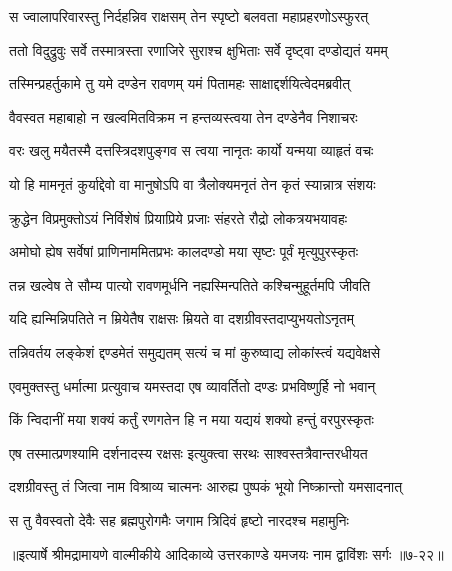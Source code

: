 \twolineshloka
{स ज्वालापरिवारस्तु निर्दहन्निव राक्षसम्}
{तेन स्पृष्टो बलवता महाप्रहरणोऽस्फुरत्} %

\twolineshloka
{ततो विदुद्रुवुः सर्वे तस्मात्रस्ता रणाजिरे}
{सुराश्च क्षुभिताः सर्वे दृष्ट्वा दण्डोद्यतं यमम्} %

\twolineshloka
{तस्मिन्प्रहर्तुकामे तु यमे दण्डेन रावणम्}
{यमं पितामहः साक्षाद्दर्शयित्वेदमब्रवीत्} %

\twolineshloka
{वैवस्वत महाबाहो न खल्वमितविक्रम}
{न हन्तव्यस्त्वया तेन दण्डेनैव निशाचरः} %

\twolineshloka
{वरः खलु मयैतस्मै दत्तस्त्रिदशपुङ्गव}
{स त्वया नानृतः कार्यो यन्मया व्याहृतं वचः} %

\twolineshloka
{यो हि मामनृतं कुर्याद्देवो वा मानुषोऽपि वा}
{त्रैलोक्यमनृतं तेन कृतं स्यान्नात्र संशयः} %

\twolineshloka
{क्रुद्धेन विप्रमुक्तोऽयं निर्विशेषं प्रियाप्रिये}
{प्रजाः संहरते रौद्रो लोकत्रयभयावहः} %

\twolineshloka
{अमोघो ह्येष सर्वेषां प्राणिनाममितप्रभः}
{कालदण्डो मया सृष्टः पूर्वं मृत्युपुरस्कृतः} %

\twolineshloka
{तन्न खल्वेष ते सौम्य पात्यो रावणमूर्धनि}
{नह्यस्मिन्पतिते कश्चिन्मुहूर्तमपि जीवति} %

\twolineshloka
{यदि ह्यन्मिन्निपतिते न म्रियेतैष राक्षसः}
{म्रियते वा दशग्रीवस्तदाप्युभयतोऽनृतम्} %

\twolineshloka
{तन्निवर्तय लङ्केशं द्दण्डमेतं समुद्यतम्}
{सत्यं च मां कुरुष्वाद्य लोकांस्त्वं यद्यवेक्षसे} %

\twolineshloka
{एवमुक्तस्तु धर्मात्मा प्रत्युवाच यमस्तदा}
{एष व्यावर्तितो दण्डः प्रभविष्णुर्हि नो भवान्} %

\twolineshloka
{किं न्विदानीं मया शक्यं कर्तुं रणगतेन हि}
{न मया यद्ययं शक्यो हन्तुं वरपुरस्कृतः} %

\twolineshloka
{एष तस्मात्प्रणश्यामि दर्शनादस्य रक्षसः}
{इत्युक्त्वा सरथः साश्वस्तत्रैवान्तरधीयत} %

\twolineshloka
{दशग्रीवस्तु तं जित्वा नाम विश्राव्य चात्मनः}
{आरुह्य पुष्पकं भूयो निष्क्रान्तो यमसादनात्} %

\twolineshloka
{स तु वैवस्वतो देवैः सह ब्रह्मपुरोगमैः}
{जगाम त्रिदिवं हृष्टो नारदश्च महामुनिः} %


॥इत्यार्षे श्रीमद्रामायणे वाल्मीकीये आदिकाव्ये उत्तरकाण्डे यमजयः नाम द्वाविंशः सर्गः ॥७-२२॥
